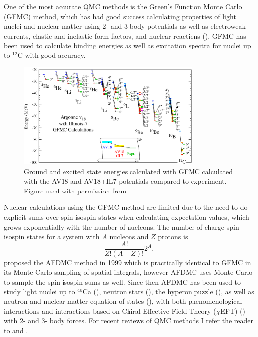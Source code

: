 One of the most accurate QMC methods is the Green's Function Monte Carlo (GFMC) method, which has had good success calculating properties of light nuclei and nuclear matter using 2- and 3-body potentials as well as electroweak currents, elastic and inelastic form factors, and nuclear reactions (\cite{carlson2015}). GFMC has been used to calculate binding energies as well as excitation spectra for nuclei up to $^{12}$C with good accuracy.
\begin{figure}[h!]
   \centering
   \includegraphics[width=0.8\textwidth]{figures/gfmc_energies.png}
   \caption{Ground and excited state energies calculated with GFMC calculated with the AV18 and AV18+IL7 potentials compared to experiment. Figure used with permission from \cite{carlson2015}.}
   \label{fig:energy_gfmc}
\end{figure}
Nuclear calculations using the GFMC method are limited due to the need to do explicit sums over spin-isospin states when calculating expectation values, which grows exponentially with the number of nucleons. The number of charge spin-isospin states for a system with $A$ nucleons and $Z$ protons is
\begin{equation}
   \frac{A!}{Z!(A-Z)!}2^A.
\end{equation}
\cite{schmidt1999} proposed the AFDMC method in 1999 which is practically identical to GFMC in its Monte Carlo sampling of spatial integrals, however AFDMC uses Monte Carlo to sample the spin-isospin sums as well. Since then AFDMC has been used to study light nuclei up to $^{40}$Ca (\cite{gandolfi2007,lonardoni2017}), neutron stars (\cite{gandolfi2014_2,gandolfi2012,tews2018}), the hyperon puzzle (\cite{lonardoni2015,gandolfi2017_2}), as well as neutron and nuclear matter equation of states (\cite{gandolfi2007_2,gandolfi2014,tews2018}), with both phenomenological interactions and interactions based on Chiral Effective Field Theory ($\chi$EFT) (\cite{lonardoni2018_3,lonardoni2018}) with 2- and 3- body forces. For recent reviews of QMC methods I refer the reader to \cite{carlson2015} and \cite{lynn2019}.

